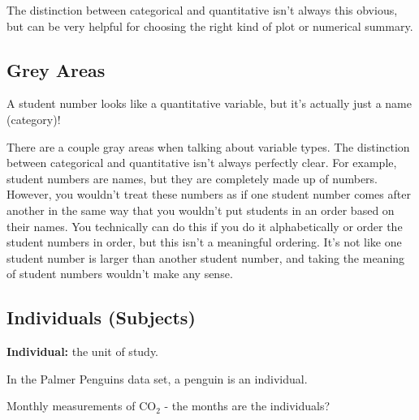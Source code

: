 \documentclass[
  letterpaper,
  DIV=11,
  numbers=noendperiod]{scrreprt}
\begin{document}
The distinction between categorical and quantitative isn't always this
obvious, but can be very helpful for choosing the right kind of plot or
numerical summary.

\hypertarget{grey-areas}{%
\subsection{Grey Areas}\label{grey-areas}}

\begin{tcolorbox}[enhanced jigsaw, toptitle=1mm, colbacktitle=quarto-callout-warning-color!10!white, breakable, leftrule=.75mm, left=2mm, opacityback=0, colframe=quarto-callout-warning-color-frame, rightrule=.15mm, toprule=.15mm, bottomtitle=1mm, titlerule=0mm, title=\textcolor{quarto-callout-warning-color}{\faExclamationTriangle}\hspace{0.5em}{Student Numbers}, arc=.35mm, colback=white, bottomrule=.15mm, opacitybacktitle=0.6, coltitle=black]

A student number looks like a quantitative variable, but it's actually
just a name (category)!

\end{tcolorbox}

There are a couple gray areas when talking about variable types. The
distinction between categorical and quantitative isn't always perfectly
clear. For example, student numbers are names, but they are completely
made up of numbers. However, you wouldn't treat these numbers as if one
student number comes after another in the same way that you wouldn't put
students in an order based on their names. You technically can do this
if you do it alphabetically or order the student numbers in order, but
this isn't a meaningful ordering. It's not like one student number is
larger than another student number, and taking the meaning of student
numbers wouldn't make any sense.

\hypertarget{individuals-subjects}{%
\subsection{Individuals (Subjects)}\label{individuals-subjects}}

\textbf{Individual:} the unit of study.

In the Palmer Penguins data set, a penguin is an individual.

\begin{tcolorbox}[enhanced jigsaw, toptitle=1mm, colbacktitle=quarto-callout-warning-color!10!white, breakable, leftrule=.75mm, left=2mm, opacityback=0, colframe=quarto-callout-warning-color-frame, rightrule=.15mm, toprule=.15mm, bottomtitle=1mm, titlerule=0mm, title=\textcolor{quarto-callout-warning-color}{\faExclamationTriangle}\hspace{0.5em}{CO\(_2\) Measurements}, arc=.35mm, colback=white, bottomrule=.15mm, opacitybacktitle=0.6, coltitle=black]

Monthly measurements of CO\(_2\) - the months are the individuals?

\end{tcolorbox}
\end{document}
